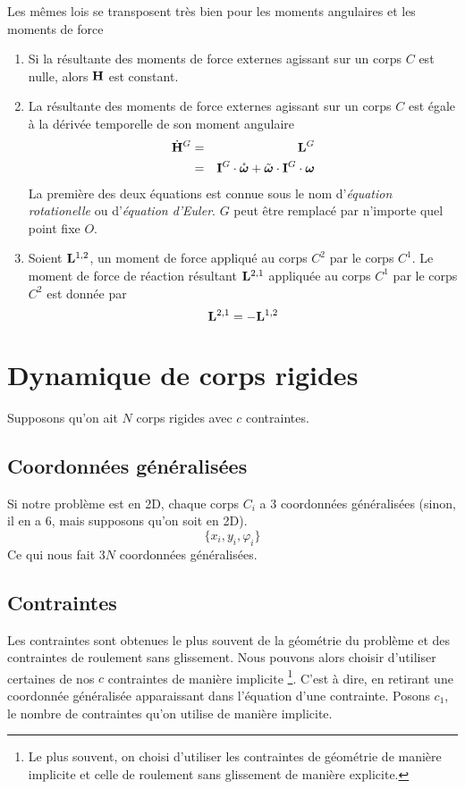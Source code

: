 Les mêmes lois se transposent très bien pour les moments angulaires et les moments de force
\begin{enumerate}
	\item Si la résultante des moments de force externes agissant sur un corps $C$ est nulle, alors ${\bf H}$ est constant.
	\item La résultante des moments de force externes agissant sur un corps $C$ est égale à la dérivée temporelle de son moment angulaire
		\begin{eqnarray*}
			\dot{{\bf H}}^G &=& {\bf L}^G\\
			&=& {\bf I}^G\cdot\mathring{\bm \omega} + \tilde{\bm \omega}\cdot{\bf I}^G\cdot{\bm \omega}
		\end{eqnarray*}
		La première des deux équations est connue sous le nom d'{\em équation rotationelle} ou d'{\em équation d'Euler}.
		$G$ peut être remplacé par n'importe quel point fixe $O$.
	\item Soient ${\bf L}^{1,2}$, un moment de force appliqué au corps $C^2$ par le corps $C^1$.
		Le moment de force de réaction résultant ${\bf L}^{2,1}$ appliquée au corps $C^1$ par le corps $C^2$ est donnée par
		\[ {\bf L}^{2,1} = -{\bf L}^{1,2} \]
\end{enumerate}

\section{Dynamique de corps rigides}

Supposons qu'on ait $N$ corps rigides avec $c$ contraintes.

\subsection{Coordonnées généralisées}
Si notre problème est en 2D, chaque corps $C_i$ a 3 coordonnées généralisées (sinon, il en a 6, mais supposons qu'on soit en 2D).
\[ \{x_i, y_i, \varphi_i \} \]
Ce qui nous fait $3N$ coordonnées généralisées.

\subsection{Contraintes}
Les contraintes sont obtenues le plus souvent de la géométrie du problème et des contraintes de roulement sans glissement.
Nous pouvons alors choisir d'utiliser certaines de nos $c$ contraintes de manière implicite
\footnote{Le plus souvent, on choisi d'utiliser les contraintes de géométrie de manière implicite et celle de roulement sans glissement de manière explicite.}.
C'est à dire, en retirant une coordonnée généralisée apparaissant dans l'équation d'une contrainte.
Posons $c_1$, le nombre de contraintes qu'on utilise de manière implicite.


